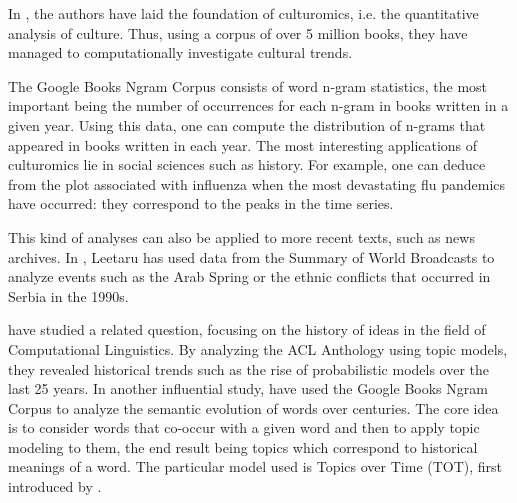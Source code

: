 
In , the authors have laid the foundation of culturomics, i.e. the quantitative analysis of culture. Thus, using a corpus of over 5 million books, they have managed to computationally investigate cultural trends.

The Google Books Ngram Corpus consists of word n-gram statistics, the most important being the number of occurrences for each n-gram in books written in a given year. Using this data, one can compute the distribution of n-grams that appeared in books written in each year. The most interesting applications of culturomics lie in social sciences such as history. For example, one can deduce from the plot associated with influenza when the most devastating flu pandemics have occurred: they correspond to the peaks in the time series.

This kind of analyses can also be applied to more recent texts, such as news archives. In , Leetaru has used data from the Summary of World Broadcasts to analyze events such as the Arab Spring or the ethnic conflicts that occurred in Serbia in the 1990s.

 have studied a related question, focusing on the history of ideas in the field of Computational Linguistics. By analyzing the ACL Anthology using topic models, they revealed historical trends such as the rise of probabilistic models over the last 25 years. In another influential study,  have used the Google Books Ngram Corpus to analyze the semantic evolution of words over centuries. The core idea is to consider words that co-occur with a given word and then to apply topic modeling to them, the end result being topics which correspond to historical meanings of a word. The particular model used is Topics over Time (TOT), first introduced by .
